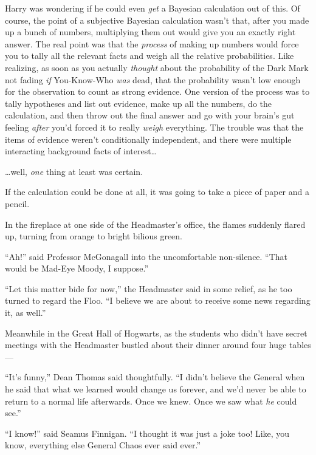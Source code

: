 Harry was wondering if he could even \emph{get} a Bayesian calculation out of this. Of course, the point of a subjective Bayesian calculation wasn’t that, after you made up a bunch of numbers, multiplying them out would give you an exactly right answer. The real point was that the \emph{process} of making up numbers would force you to tally all the relevant facts and weigh all the relative probabilities. Like realizing, as soon as you actually \emph{thought} about the probability of the Dark Mark not fading \emph{if} You-Know-Who \emph{was} dead, that the probability wasn’t low enough for the observation to count as strong evidence. One version of the process was to tally hypotheses and list out evidence, make up all the numbers, do the calculation, and then throw out the final answer and go with your brain’s gut feeling \emph{after} you’d forced it to really \emph{weigh} everything. The trouble was that the items of evidence weren’t conditionally independent, and there were multiple interacting background facts of interest…

…well, \emph{one} thing at least was certain.

If the calculation could be done at all, it was going to take a piece of paper and a pencil.

In the fireplace at one side of the Headmaster’s office, the flames suddenly flared up, turning from orange to bright bilious green.

“Ah!” said Professor McGonagall into the uncomfortable non-silence. “That would be Mad-Eye Moody, I suppose.”

“Let this matter bide for now,” the Headmaster said in some relief, as he too turned to regard the Floo. “I believe we are about to receive some news regarding it, as well.”


Meanwhile in the Great Hall of Hogwarts, as the students who didn’t have secret meetings with the Headmaster bustled about their dinner around four huge tables—

“It’s funny,” Dean Thomas said thoughtfully. “I didn’t believe the General when he said that what we learned would change us forever, and we’d never be able to return to a normal life afterwards. Once we knew. Once we saw what \emph{he} could see.”

“I know!” said Seamus Finnigan. “I thought it was just a joke too! Like, you know, everything else General Chaos ever said ever.”

